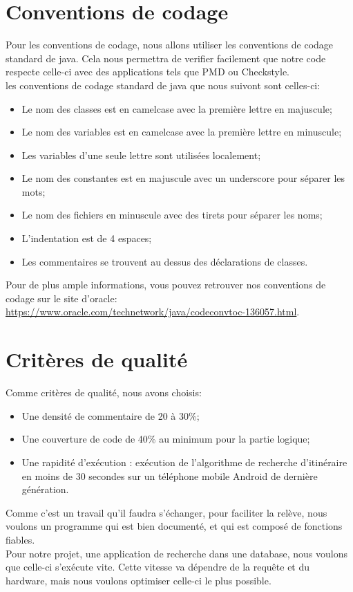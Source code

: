 \documentclass[a4paper,11pt]{article}
\begin{document}
\section{Conventions de codage}
Pour les conventions de codage, nous allons utiliser les conventions de codage standard de java.
Cela nous permettra de verifier facilement que notre code respecte celle-ci avec des applications tels que PMD ou Checkstyle.\\
les conventions de codage standard de java que nous suivont sont celles-ci:
\begin{itemize}
  \item Le nom des classes est en camelcase avec la première lettre en majuscule;
  \item Le nom des variables est en camelcase avec la première lettre en minuscule;
  \item Les variables d'une seule lettre sont utilisées localement;
  \item Le nom des constantes est en majuscule avec un underscore pour séparer les mots;
  \item Le nom des fichiers en minuscule avec des tirets pour séparer les noms;
  \item L'indentation est de 4 espaces;
  \item Les commentaires se trouvent au dessus des déclarations de classes.
\end{itemize}


Pour de plus ample informations, vous pouvez retrouver nos conventions de codage sur le site d'oracle:
\url{https://www.oracle.com/technetwork/java/codeconvtoc-136057.html}.

\section{Critères de qualité}
Comme critères de qualité, nous avons choisis:
\begin{itemize}
  \item Une densité de commentaire de 20 à 30\%;
  \item Une couverture de code de 40\% au minimum pour la partie logique;
  \item Une rapidité d'exécution : exécution de l'algorithme de recherche d'itinéraire en moins de 30 secondes sur un téléphone mobile Android de dernière génération.
\end{itemize}


Comme c'est un travail qu'il faudra s'échanger, pour faciliter la relève,
nous voulons un programme qui est bien documenté, et qui est composé de fonctions fiables.\\
Pour notre projet, une application de recherche dans une database, nous voulons que celle-ci s'exécute vite.
Cette vitesse va dépendre de la requête et du hardware, mais nous voulons optimiser celle-ci le plus possible.
\end{document}
